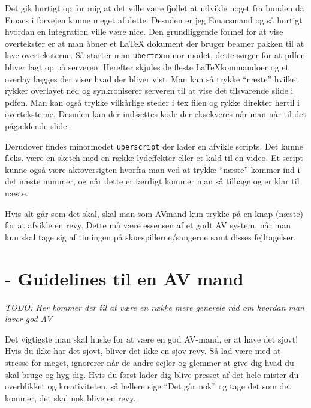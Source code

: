\documentclass[10pt,a4paper,danish]{article}
\begin{document}
Det gik hurtigt op for mig at det ville være fjollet at udvikle noget fra bunden
da Emacs i forvejen kunne meget af dette. Desuden er jeg Emacsmand og så hurtigt
hvordan en integration ville være nice.
Den grundliggende formel for at vise overtekster er at man åbner et LaTeX
dokument der bruger beamer pakken til at lave overteksterne. Så starter man
\texttt{ubertex}minor modet, dette sørger for at pdfen bliver lagt op på
serveren. Herefter skjules de fleste LaTeXkommandoer og et overlay lægges der
viser hvad der bliver vist. Man kan så trykke ``næste'' hvilket rykker overlayet ned
og synkroniserer serveren til at vise det tilsvarende slide i pdfen.
Man kan også trykke vilkårlige steder i tex filen og rykke direkter hertil i
overteksterne. Desuden kan der indsættes kode der eksekveres når man når til det
pågældende slide.


Derudover findes minormodet \texttt{uberscript} der lader en afvikle scripts.
Det kunne f.eks. være en sketch med en række lydeffekter eller et kald til en video.
Et script kunne også være aktoversigten hvorfra man ved at trykke ``næste''
kommer ind i det næste nummer, og når dette er færdigt kommer man så tilbage og
er klar til næste.

Hvis alt går som det skal, skal man som AVmand kun trykke på en knap (næste) for
at afvikle en revy.
Dette må være essensen af et godt AV system, når man kun skal tage sig af
timingen på skuespillerne/sangerne samt disses fejltagelser.

\newpage
\section{- Guidelines til en AV mand}
\label{sec:god-av-mand}


\textit{TODO: Her kommer der til at være en række mere generele råd om hvordan
  man laver god AV}

Det vigtigste man skal huske for at være en god AV-mand, er at have det sjovt!
Hvis du ikke har det sjovt, bliver det ikke en sjov revy.
Så lad være med at stresse for meget, ignorerer når de andre sejler og glemmer
at give dig hvad du skal bruge og hyg dig.
Hvis du først lader dig blive presset af det hele mister du overblikket og
kreativiteten, så hellere sige ``Det går nok'' og tage det som det kommer, det
skal nok blive en revy.
\end{document}
